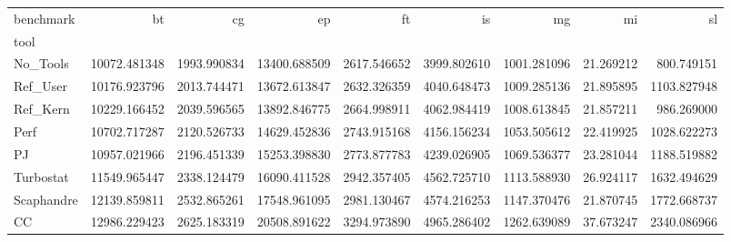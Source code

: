 \begin{tabular}{lrrrrrrrr}
\toprule
benchmark & bt & cg & ep & ft & is & mg & mi & sl \\
tool &  &  &  &  &  &  &  &  \\
\midrule
No_Tools & 10072.481348 & 1993.990834 & 13400.688509 & 2617.546652 & 3999.802610 & 1001.281096 & 21.269212 & 800.749151 \\
Ref_User & 10176.923796 & 2013.744471 & 13672.613847 & 2632.326359 & 4040.648473 & 1009.285136 & 21.895895 & 1103.827948 \\
Ref_Kern & 10229.166452 & 2039.596565 & 13892.846775 & 2664.998911 & 4062.984419 & 1008.613845 & 21.857211 & 986.269000 \\
Perf & 10702.717287 & 2120.526733 & 14629.452836 & 2743.915168 & 4156.156234 & 1053.505612 & 22.419925 & 1028.622273 \\
PJ & 10957.021966 & 2196.451339 & 15253.398830 & 2773.877783 & 4239.026905 & 1069.536377 & 23.281044 & 1188.519882 \\
Turbostat & 11549.965447 & 2338.124479 & 16090.411528 & 2942.357405 & 4562.725710 & 1113.588930 & 26.924117 & 1632.494629 \\
Scaphandre & 12139.859811 & 2532.865261 & 17548.961095 & 2981.130467 & 4574.216253 & 1147.370476 & 21.870745 & 1772.668737 \\
CC & 12986.229423 & 2625.183319 & 20508.891622 & 3294.973890 & 4965.286402 & 1262.639089 & 37.673247 & 2340.086966 \\
\bottomrule
\end{tabular}
